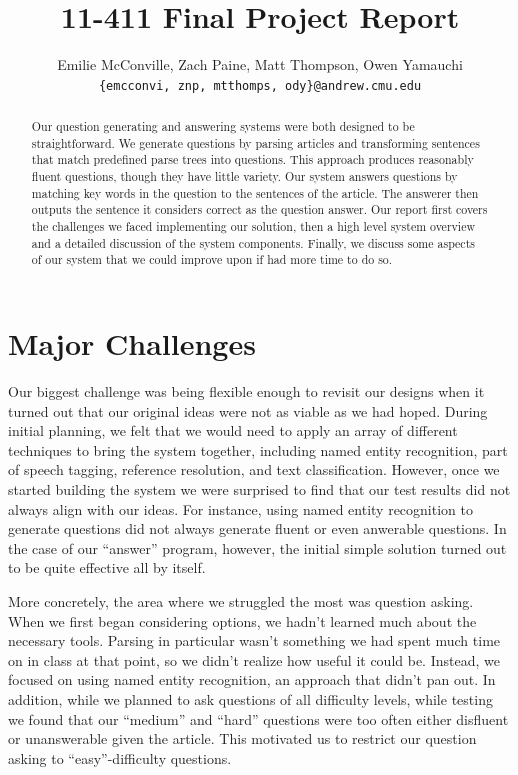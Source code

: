 \documentclass[11pt]{article}
\begin{document}
  
  \thispagestyle{plain}
  \title{11-411 Final Project Report}
  \author{Emilie McConville, Zach Paine, Matt Thompson, Owen Yamauchi \\
    {\tt \{emcconvi, znp, mtthomps, ody\}@andrew.cmu.edu}}
  \maketitle
  
\begin{abstract}
Our question generating and answering systems were both designed to be
straightforward. We generate questions by parsing articles and transforming
sentences that match predefined parse trees into questions. This approach
produces reasonably fluent questions, though they have little variety. Our
system answers questions by matching key words in the question to the sentences
of the article. The answerer then outputs the sentence it considers correct as
the question answer. Our report first covers the challenges we faced
implementing our solution, then a high level system overview and a detailed
discussion of the system components. Finally, we discuss some aspects of our system that we could improve upon if had more time to do so.
\end{abstract}

\section{Major Challenges}

Our biggest challenge was being flexible enough to revisit our designs when it
turned out that our original ideas were not as viable as we had hoped. During
initial planning, we felt that we would need to apply an array of different
techniques to bring the system together, including named entity recognition,
part of speech tagging, reference resolution, and text classification. However,
once we started building the system we were surprised to find that our test
results did not always align with our ideas. For instance, using named entity
recognition to generate questions did not always generate fluent or even
anwerable questions. In the case of our ``answer'' program, however, the initial
simple solution turned out to be quite effective all by itself.

More concretely, the area where we struggled the most was question asking. When
we first began considering options, we hadn't learned much about the necessary
tools. Parsing in particular wasn't something we had spent much time on in class
at that point, so we didn't realize how useful it could be. Instead, we focused
on using named entity recognition, an approach that didn't pan out. In addition,
while we planned to ask questions of all difficulty levels, while testing we
found that our ``medium'' and ``hard'' questions were too often either disfluent
or unanswerable given the article. This motivated us to restrict our question
asking to ``easy''-difficulty questions.
\end{document}
